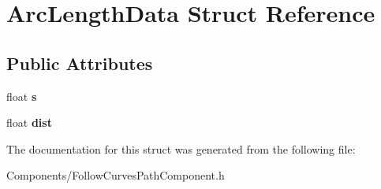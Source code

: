 \hypertarget{structArcLengthData}{}\section{Arc\+Length\+Data Struct Reference}
\label{structArcLengthData}
\subsection*{Public Attributes}
\begin{DoxyCompactItemize}
\item 
\mbox{\label{structArcLengthData_a9eb61e1228b5955c2f17b656b6034330}} 
float {\bfseries s}
\item 
\mbox{\label{structArcLengthData_aa40e451c1fb61467c393a3ad41515789}} 
float {\bfseries dist}
\end{DoxyCompactItemize}


The documentation for this struct was generated from the following file\+:\begin{DoxyCompactItemize}
\item 
Components/Follow\+Curves\+Path\+Component.\+h\end{DoxyCompactItemize}
